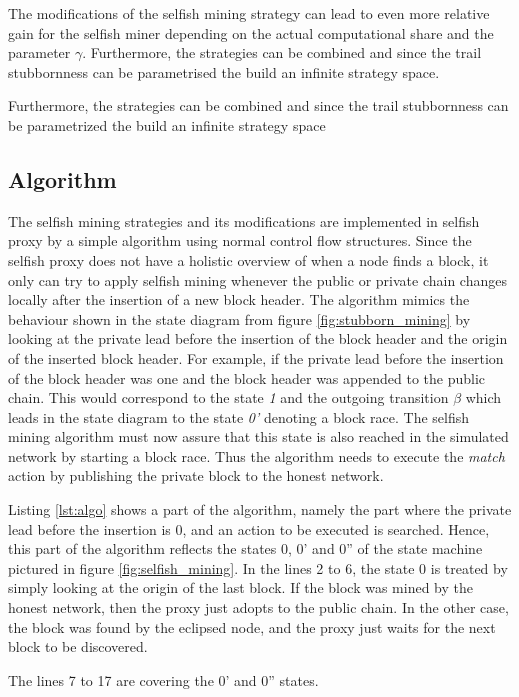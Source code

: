 The modifications of the selfish mining strategy can lead to even more relative gain for the selfish miner depending on the actual computational share and the parameter $\gamma$.
Furthermore, the strategies can be combined and since the trail stubbornness can be parametrised the build an infinite strategy space.

Furthermore, the strategies can be combined and since the trail stubbornness can be parametrized the build an infinite strategy space

\subsection{Algorithm}

The selfish mining strategies and its modifications are implemented in selfish proxy by a simple algorithm using normal control flow structures.
Since the selfish proxy does not have a holistic overview of when a node finds a block, it only can try to apply selfish mining whenever the public or private chain changes locally after the insertion of a new block header.
The algorithm mimics the behaviour shown in the state diagram from figure \ref{fig:stubborn_mining} by looking at the private lead before the insertion of the block header and the origin of the inserted block header.
For example, if the private lead before the insertion of the block header was one and the block header was appended to the public chain.
This would correspond to the state \textit{1} and the outgoing transition $\beta$ which leads in the state diagram to the state \textit{0'} denoting a block race.
The selfish mining algorithm must now assure that this state is also reached in the simulated network by starting a block race.
Thus the algorithm needs to execute the \textit{match} action by publishing the private block to the honest network.

Listing \ref{lst:algo} shows a part of the algorithm, namely the part where the private lead before the insertion is 0, and an action to be executed is searched.
Hence, this part of the algorithm reflects the states 0, 0' and 0'' of the state machine pictured in figure \ref{fig:selfish_mining}.
In the lines 2 to 6, the state 0 is treated by simply looking at the origin of the last block.
If the block was mined by the honest network, then the proxy just adopts to the public chain.
In the other case, the block was found by the eclipsed node, and the proxy just waits for the next block to be discovered.

The lines 7 to 17 are covering the 0' and 0'' states.


